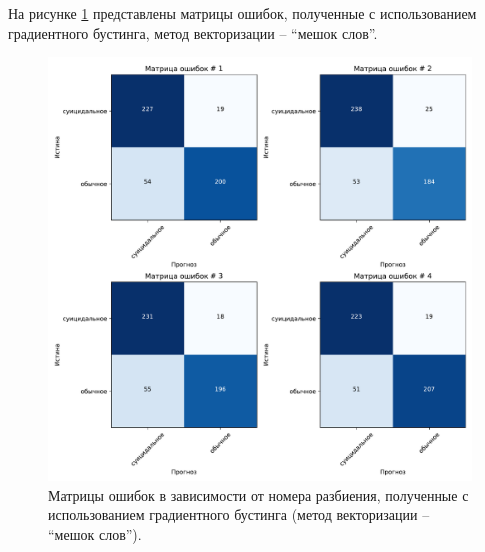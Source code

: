 На рисунке \ref{img:gradientMatrBag} представлены матрицы ошибок, полученные с использованием градиентного бустинга, метод векторизации -- ``мешок слов''.
\begin{figure}[H]
	\centering
	\includegraphics[width=\textwidth]{inc/plots/gradientMatrBag.pdf}
	\caption{ Матрицы ошибок в зависимости от номера разбиения, полученные с использованием градиентного бустинга (метод векторизации -- ``мешок слов''). }
	\label{img:gradientMatrBag}
\end{figure}

